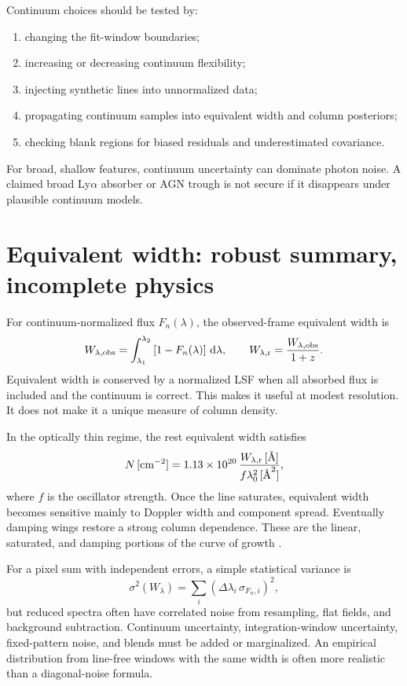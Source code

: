 Continuum choices should be tested by:
\begin{enumerate}
  \item changing the fit-window boundaries;
  \item increasing or decreasing continuum flexibility;
  \item injecting synthetic lines into unnormalized data;
  \item propagating continuum samples into equivalent width and column
  posteriors;
  \item checking blank regions for biased residuals and underestimated
  covariance.
\end{enumerate}
For broad, shallow features, continuum uncertainty can dominate photon noise.
A claimed broad Ly$\alpha$ absorber or AGN trough is not secure if it
disappears under plausible continuum models.

\section{Equivalent width: robust summary, incomplete physics}

For continuum-normalized flux $F_n(\lambda)$, the observed-frame equivalent
width is
\begin{equation}
 W_{\lambda,\rm obs}=\int_{\lambda_1}^{\lambda_2}
       \left[1-F_n(\lambda)\right]\,{\rm d}\lambda,
 \qquad
 W_{\lambda,\rm r}=\frac{W_{\lambda,\rm obs}}{1+z}.
 \label{eq:abs-equivalent-width}
\end{equation}
Equivalent width is conserved by a normalized LSF when all absorbed flux is
included and the continuum is correct. This makes it useful at modest
resolution. It does not make it a unique measure of column density.

In the optically thin regime, the rest equivalent width satisfies
\begin{equation}
 N\,[{\rm cm^{-2}}] =
 1.13\times10^{20}\,
 \frac{W_{\lambda,\rm r}\,[\text{\AA}]}
      {f\lambda_0^2\,[\text{\AA}^2]},
 \label{eq:abs-linear-cog}
\end{equation}
where $f$ is the oscillator strength. Once the line saturates, equivalent
width becomes sensitive mainly to Doppler width and component spread.
Eventually damping wings restore a strong column dependence. These are the
linear, saturated, and damping portions of the curve of growth
\citep{Spitzer1978,Draine2011}.

For a pixel sum with independent errors, a simple statistical variance is
\begin{equation}
 \sigma^2(W_\lambda)
 =\sum_i \left(\Delta\lambda_i\,\sigma_{F_n,i}\right)^2,
\end{equation}
but reduced spectra often have correlated noise from resampling, flat fields,
and background subtraction. Continuum uncertainty, integration-window
uncertainty, fixed-pattern noise, and blends must be added or marginalized.
An empirical distribution from line-free windows with the same width is often
more realistic than a diagonal-noise formula.


